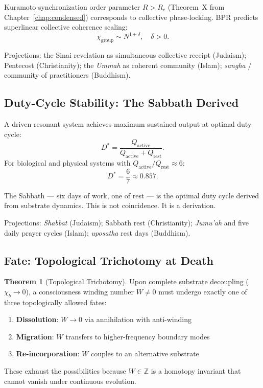 \documentclass[12pt,oneside]{book}
\theoremstyle{definition}
\newtheorem{theorem}{Theorem}[chapter]
\begin{document}
Kuramoto synchronization order parameter $R > R_c$ (Theorem~X from
Chapter~\ref{chap:condensed}) corresponds to collective phase-locking.
BPR predicts superlinear collective coherence scaling:
\begin{equation}
  \chi_{\mathrm{group}} \sim N^{1+\delta}, \quad \delta > 0.
\end{equation}

\noindent Projections: the Sinai revelation as simultaneous collective receipt
(Judaism); Pentecost (Christianity); the \textit{Ummah} as coherent community (Islam);
\textit{sangha} / community of practitioners (Buddhism).

\subsection{Duty-Cycle Stability: The Sabbath Derived}

A driven resonant system achieves maximum sustained output at optimal duty cycle:
\begin{equation}
  D^* = \frac{Q_{\mathrm{active}}}{Q_{\mathrm{active}} + Q_{\mathrm{rest}}}.
\end{equation}
For biological and physical systems with $Q_{\mathrm{active}}/Q_{\mathrm{rest}} \approx 6$:
\begin{equation}
  D^* = \frac{6}{7} \approx 0.857.
\end{equation}

The Sabbath --- six days of work, one of rest --- is the optimal duty cycle derived
from substrate dynamics. This is not coincidence. It is a derivation.

\noindent Projections: \textit{Shabbat} (Judaism); Sabbath rest (Christianity);
\textit{Jumu'ah} and five daily prayer cycles (Islam); \textit{uposatha} rest days (Buddhism).

\subsection{Fate: Topological Trichotomy at Death}

\begin{theorem}[Topological Trichotomy]
  \label{thm:trichotomy}
  Upon complete substrate decoupling ($\chi_b \to 0$), a consciousness winding
  number $W \neq 0$ must undergo exactly one of three topologically allowed fates:
  \begin{enumerate}
    \item \textbf{Dissolution}: $W \to 0$ via annihilation with anti-winding
    \item \textbf{Migration}: $W$ transfers to higher-frequency boundary modes
    \item \textbf{Re-incorporation}: $W$ couples to an alternative substrate
  \end{enumerate}
  These exhaust the possibilities because $W \in \mathbb{Z}$ is a homotopy invariant
  that cannot vanish under continuous evolution.
\end{theorem}
\end{document}
